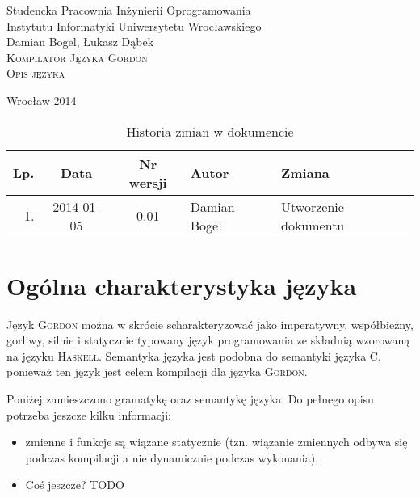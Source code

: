 \documentclass{documentation}
\begin{document}
\begin{titlepage}
\begin{center}
Studencka Pracownia Inżynierii Oprogramowania\\
Instytutu Informatyki Uniwersytetu Wrocławskiego\\[6cm]

Damian Bogel, Łukasz Dąbek\\[1cm]
\textsc{\LARGE Kompilator Języka Gordon}\\[0.5cm]
\textsc{\large Opis języka}

\vfill
Wrocław 2014 \\[2.5cm]

\end{center}
\end{titlepage}

\newpage
\begin{table}
	\centering
    \captionsetup{name=Tabela}
	\caption{Historia zmian w dokumencie}
		\begin{tabular}{|r|c|c|l|l|}
		\hline
		Lp.  & Data       & Nr wersji & Autor                 & Zmiana \\ \hline
		1.   & 2014-01-05 & 0.01 & Damian Bogel & Utworzenie dokumentu \\ \hline
	\end{tabular}
\end{table}
\newpage

\tableofcontents
\setcounter{page}{2}

\newpage

\section{Ogólna charakterystyka języka}
Język \textsc{Gordon} można w skrócie scharakteryzować jako imperatywny, współbieżny,
gorliwy, silnie i statycznie typowany język programowania ze składnią wzorowaną
na języku \textsc{Haskell}. Semantyka języka jest podobna do semantyki języka
\textsc{C}, ponieważ ten język jest celem kompilacji dla języka \textsc{Gordon}.

Poniżej zamieszczono gramatykę oraz semantykę języka. Do pełnego opisu potrzeba
jeszcze kilku informacji:

\begin{itemize}
    \item zmienne i funkcje są wiązane statycznie (tzn. wiązanie zmiennych odbywa się
        podczas kompilacji a nie dynamicznie podczas wykonania),
    \item Coś jeszcze? TODO
\end{itemize}
\end{document}
